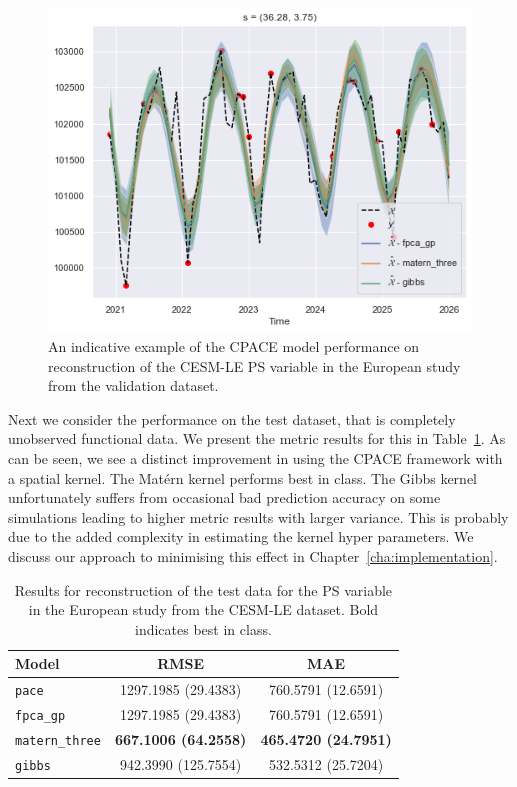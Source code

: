 \begin{figure}
	\centering
	\includegraphics[width=\textwidth]{train_ex_ps_eur}
	\caption[An indicative example of the CPACE model performance on reconstruction of the CESM-LE PS variable in the European study from the validation dataset.]{An indicative example of the CPACE model performance on reconstruction of the CESM-LE PS variable in the European study from the validation dataset.}
	\label{fig:train_ex_ps_eur}
\end{figure}

Next we consider the performance on the test dataset, that is completely unobserved functional data.
We present the metric results for this in Table~\ref{tab:test_cesm_ps_eur}.
As can be seen, we see a distinct improvement in using the CPACE framework with a spatial kernel.
The Mat\'ern kernel performs best in class.
The Gibbs kernel unfortunately suffers from occasional bad prediction accuracy on some simulations leading to higher metric results with larger variance.
This is probably due to the added complexity in estimating the kernel hyper parameters.
We discuss our approach to minimising this effect in Chapter~\ref{cha:implementation}.

\begin{table}
	\caption[Results for PS variable on test data in the European study]{Results for reconstruction of the test data for the PS variable in the European study from the CESM-LE dataset. Bold indicates best in class.}
	\centering
	\label{tab:test_cesm_ps_eur}
	\begin{tabular}{lcc}
		\toprule
		\textbf{Model} & \textbf{RMSE} & \textbf{MAE} \\
		\midrule
		\verb*|pace| & 1297.1985 (29.4383) & 760.5791 (12.6591) \\
		\verb*|fpca_gp| & 1297.1985 (29.4383) & 760.5791 (12.6591) \\
		\verb*|matern_three| & \textbf{667.1006 (64.2558)}& \textbf{465.4720 (24.7951)}\\
		\verb*|gibbs| & 942.3990 (125.7554) & 532.5312 (25.7204)\\
		\bottomrule
	\end{tabular}
\end{table}

